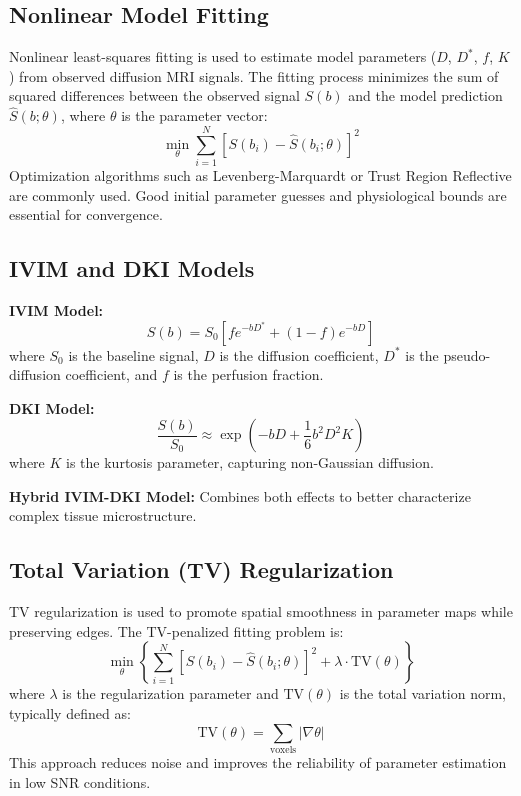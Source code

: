 \documentclass[a4paper,12pt]{article}
\begin{document}
\subsection*{Nonlinear Model Fitting}

Nonlinear least-squares fitting is used to estimate model parameters ($D$, $D^*$, $f$, $K$) from observed diffusion MRI signals. The fitting process minimizes the sum of squared differences between the observed signal $S(b)$ and the model prediction $\hat{S}(b; \theta)$, where $\theta$ is the parameter vector:
\begin{equation}
    \min_{\theta} \sum_{i=1}^{N} \left[ S(b_i) - \hat{S}(b_i; \theta) \right]^2
\end{equation}
Optimization algorithms such as Levenberg-Marquardt or Trust Region Reflective are commonly used. Good initial parameter guesses and physiological bounds are essential for convergence.

\subsection*{IVIM and DKI Models}

\textbf{IVIM Model:}
\begin{equation}
    S(b) = S_0 \left[ f e^{-b D^*} + (1-f) e^{-b D} \right]
\end{equation}
where $S_0$ is the baseline signal, $D$ is the diffusion coefficient, $D^*$ is the pseudo-diffusion coefficient, and $f$ is the perfusion fraction.

\textbf{DKI Model:}
\begin{equation}
    \frac{S(b)}{S_0} \approx \exp\left( -b D + \frac{1}{6} b^2 D^2 K \right)
\end{equation}
where $K$ is the kurtosis parameter, capturing non-Gaussian diffusion.

\textbf{Hybrid IVIM-DKI Model:}
Combines both effects to better characterize complex tissue microstructure.

\subsection*{Total Variation (TV) Regularization}

TV regularization is used to promote spatial smoothness in parameter maps while preserving edges. The TV-penalized fitting problem is:
\begin{equation}
    \min_{\theta} \left\{ \sum_{i=1}^{N} \left[ S(b_i) - \hat{S}(b_i; \theta) \right]^2 + \lambda \cdot \mathrm{TV}(\theta) \right\}
\end{equation}
where $\lambda$ is the regularization parameter and $\mathrm{TV}(\theta)$ is the total variation norm, typically defined as:
\begin{equation}
    \mathrm{TV}(\theta) = \sum_{\text{voxels}} \left| \nabla \theta \right|
\end{equation}
This approach reduces noise and improves the reliability of parameter estimation in low SNR conditions.
\end{document}
